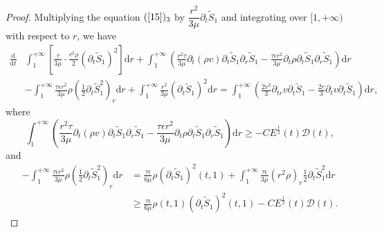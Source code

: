 \documentclass[10pt,reqno]{amsart}
\numberwithin{equation}{section}
\begin{document}
\begin{proof}
		Multiplying the equation $(\ref{15})_3$ by $\dfrac{r^2}{3 \mu} \partial_t \tilde{S}_1$ and integrating over $[1,+\infty)$ with respect to $r$, we have
		\begin{equation}\label{18}
			\begin{aligned}
				\frac{\mathrm{d}}{\mathrm{d} t}& \int_{1}^{+\infty}\left[\frac{\tau}{3 \mu} \cdot \frac{r^2 \rho}{2}\left(\partial_t \tilde{S}_1\right)^2\right]\mathrm{d} r +\int_{1}^{+\infty}(\frac{r^2 \tau}{3 \mu} \partial_t (\rho v) \partial_t \tilde{S}_1 \partial_r \tilde{S}_1
				-\frac{\tau \epsilon r^2}{3 \mu} \partial_{t}\rho\partial_t\tilde{S}_1\partial_r \tilde{S}_1)\mathrm{d} r\\
				&-\int_{1}^{+\infty}\frac{\tau  \epsilon r^2}{3 \mu}\rho(\frac{1}{2}\partial_t\tilde{S}_1^2)_r\mathrm{d} r
				+\int_{1}^{+\infty}\frac{r^2}{3 \mu}(\partial_t \tilde{S}_1)^2\mathrm{d} r
				=\int_{1}^{+\infty}(\frac{2 r^2}{3} \partial_{tr}v \partial_t \tilde{S}_1-\frac{2 r}{3} \partial_{t}v \partial_t \tilde{S}_1)\mathrm{d} r
				,
			\end{aligned}
		\end{equation}
		where
		\begin{equation}\nonumber
			\int_{1}^{+\infty}(\frac{r^2 \tau}{3 \mu} \partial_t (\rho v) \partial_t \tilde{S}_1 \partial_r \tilde{S}_1
			-\frac{\tau \epsilon r^2}{3 \mu} \partial_{t}\rho\partial_t\tilde{S}_1\partial_r \tilde{S}_1)\mathrm{d} r
			\geq -C E^{\frac{1}{2}}(t) \mathcal{D}(t),
		\end{equation}
		and
		\begin{equation}
			\begin{aligned}
				\nonumber
				-\int_{1}^{+\infty}\frac{\tau  \epsilon r^2}{3 \mu}\rho(\frac{1}{2}\partial_t\tilde{S}_1^2)_r\mathrm{d}r
				&=\frac{\tau \epsilon}{6 \mu}\rho(\partial_t\tilde{S}_1)^2(t,1)
				+\int_{1}^{+\infty}\frac{\tau  \epsilon }{3 \mu}(r^2\rho)_r\frac{1}{2}\partial_t\tilde{S}_1^2\mathrm{d}r\\
				&\geq\frac{\tau \epsilon}{6 \mu}\rho(t,1)(\partial_t\tilde{S}_1)^2(t,1) -C E^{\frac{1}{2}}(t) \mathcal{D}(t).
			\end{aligned}
		\end{equation}
		

\end{proof}
\end{document}
